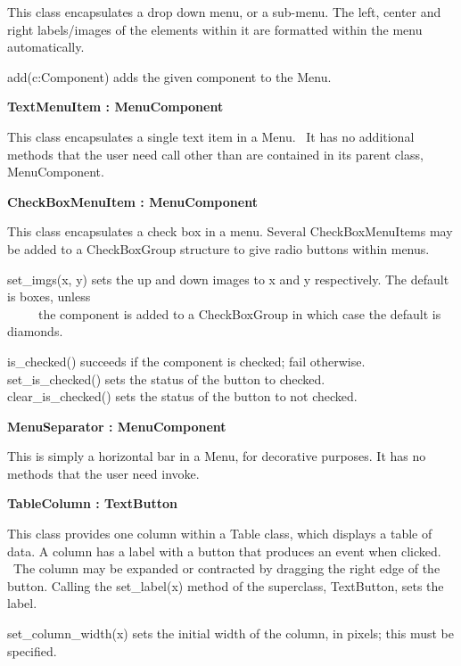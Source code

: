 This class encapsulates a drop down menu, or a sub-menu. The left,
center and right labels/images of the elements within it are formatted
within the menu automatically.

add(c:Component) adds the given component to the Menu.

{\sffamily\bfseries
TextMenuItem : MenuComponent}

This class encapsulates a single text item in a Menu. \ It has no
additional methods that the user need call other than are contained in
its parent class, MenuComponent.

{\sffamily\bfseries
{}CheckBoxMenuItem : MenuComponent}

This class encapsulates a check box in a menu. Several CheckBoxMenuItems
may be added to a CheckBoxGroup structure to give {\textquotedbl}radio
buttons{\textquotedbl} within menus.

set\_imgs(x, y) sets the up and down images to x and y respectively. The
default is boxes, unless\\
 \ \ \ \ \ the component is added to a CheckBoxGroup in which case the
default is diamonds.

is\_checked() succeeds if the component is checked; fail
otherwise.\\
set\_is\_checked() sets the status of the button to checked.\\
clear\_is\_checked() sets the status of the button to not checked.

{\sffamily\bfseries
{}MenuSeparator : MenuComponent}

This is simply a horizontal bar in a Menu, for decorative purposes. It
has no methods that the user need invoke.

{\sffamily\bfseries
{}TableColumn : TextButton}

This class provides one column within a Table class, which displays a
table of data. A column has a label with a button that produces an
event when clicked. \ The column may be expanded or contracted by
dragging the right edge of the button. Calling the set\_label(x) method
of the superclass, TextButton, sets the label.

set\_column\_width(x) sets the initial width of the column, in pixels;
this must be specified.


